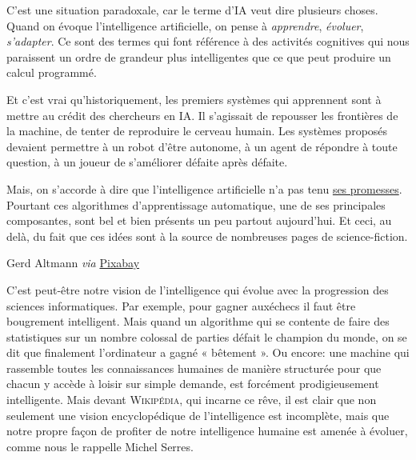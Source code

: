 
C’est une situation paradoxale, car le terme d’IA veut dire plusieurs choses. Quand on évoque l’intelligence artificielle, on pense à \emph{appren\-dre}, \emph{évoluer}, \emph{s’adapter}. Ce sont des termes qui font référence à des activités cognitives qui nous paraissent un ordre de grandeur plus intelligentes que ce que peut produire un calcul programmé.

Et c’est vrai qu’historiquement, les premiers systèmes qui appren\-nent sont à mettre au crédit des chercheurs en IA. Il s’agissait de repousser les frontières de la machine, de tenter de reproduire le cerveau humain. Les systèmes proposés devaient permettre à un robot d’être autonome, à un agent de répondre à toute question, à un joueur de s’améliorer défaite après défaite.

Mais, on s’accorde à dire que l’intelligence artificielle n’a pas tenu \href{http://www.scilogs.fr/intelligence-mecanique/lintelligence-artificielle-naura-pas-lieu/}{ses promesses}. Pourtant ces algorithmes d’apprentissage automatique, une de ses principales composantes, sont bel et bien présents un peu partout aujourd’hui. Et ceci, au delà, du fait que ces idées sont à la source de nombreuses pages de science-fiction.

\begin{jazzgraphic*}
%
{Gerd Altmann \textit{via} \href{https://pixabay.com}{Pixabay}}
\end{jazzgraphic*}

C’est peut-être notre vision de l’intelligence qui évolue avec la progression des sciences informatiques. Par exemple, pour gagner aux\linebreak échecs il faut être bougrement intelligent. Mais quand un algorithme qui se contente de faire des statistiques sur un nombre colossal de parties défait le champion du monde, on se dit que finalement l’ordinateur a gagné « bêtement ». Ou encore: une machine qui rassemble toutes les connaissances humaines de manière structurée pour que chacun y accède à loisir sur simple demande, est forcément prodigieusement intelligente. Mais devant \textsc{Wikipédia}, qui incarne ce rêve, il est clair que non seulement une vision encyclopédique de l’intelligence est incomplète, mais que notre propre façon de profiter de notre intelligence humaine est amenée à évoluer, comme nous le rappelle Michel Serres.


